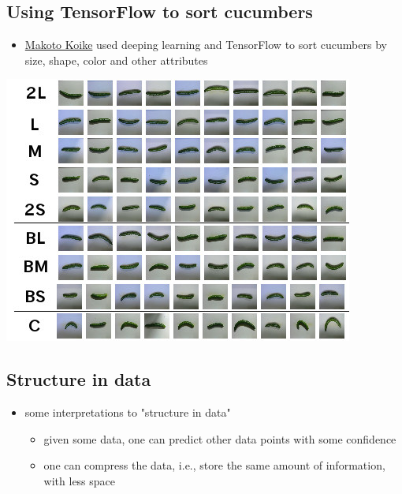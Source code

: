 \documentclass[11pt]{article}
\begin{document}
\subsection*{Using TensorFlow to sort cucumbers}
\label{sec:org7463012}
\begin{itemize}
\item \href{https://cloud.google.com/blog/big-data/2016/08/how-a-japanese-cucumber-farmer-is-using-deep-learning-and-tensorflow}{Makoto Koike} used deeping learning and TensorFlow to sort cucumbers by size, shape, color and other attributes
\end{itemize}

\begin{center}
\begin{center}
\includegraphics[width=.9\linewidth]{images/cucumber.png}
\end{center}
\end{center}

\subsection*{Structure in data}
\label{sec:org5a8c725}
\begin{itemize}
\item some interpretations to "structure in data"
\begin{itemize}
\item given some data, one can predict other data points with some confidence
\item one can compress the data, i.e., store the same amount of information, with
less space
\end{itemize}
\end{itemize}
\end{document}
